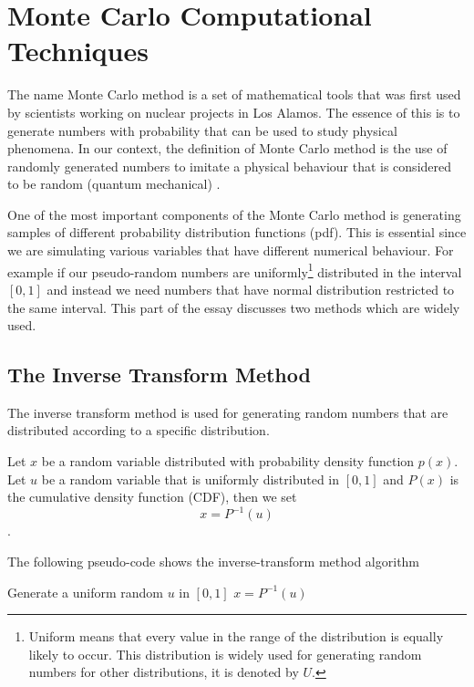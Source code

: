 \chapter{Monte Carlo Computational Techniques}

The name Monte Carlo method is a set of mathematical tools that was first used by scientists working on nuclear projects in Los Alamos. The essence of this is to generate numbers with probability that can be used to study physical phenomena. In our context, the definition of Monte Carlo method is the use of randomly generated numbers to imitate a physical behaviour that is considered to be random (quantum mechanical) \citep{montecarlo}.


One of the most important components of the Monte Carlo method is generating samples of different probability distribution functions (pdf). This is essential since we are simulating various variables that have different numerical behaviour. For example if our pseudo-random numbers are uniformly\footnote{Uniform means that every value in the range of the distribution is equally likely to occur. This distribution is widely used for generating random numbers for other distributions, it is denoted by $U$.} distributed in the interval $[0,1]$  and instead we need numbers that have normal distribution restricted to the same interval. This part of the essay  discusses two methods which are widely used.


\section{The Inverse Transform Method}

The inverse transform method is used for generating random numbers that are distributed according to a specific distribution. 

Let $x$ be a random variable distributed with probability density function $p(x)$. Let $u$ be a random variable that is uniformly distributed in $[0,1]$ and $P(x)$ is the cumulative density function (CDF), then we set 
\begin{equation}
x = P^{-1} (u)
\end{equation}\citep{Weinzierl}.

   
The following pseudo-code shows the inverse-transform method algorithm 
\begin{algorithmic}
\State Generate a uniform  random $u$ in $[0,1]$
\State \Return $x = P^{-1}(u)$
\end{algorithmic}

